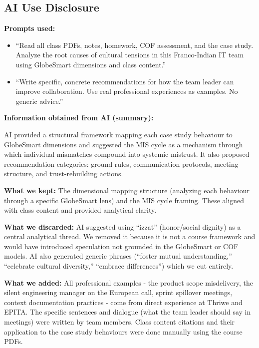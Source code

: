 \documentclass[12pt, a4paper]{article}
\begin{document}
\vspace{3em}

\subsection*{AI Use Disclosure}

\textbf{Prompts used:}
\begin{itemize}[noitemsep]
    \item ``Read all class PDFs, notes, homework, COF assessment, and the case study. Analyze the root causes of cultural tensions in this Franco-Indian IT team using GlobeSmart dimensions and class content.''
    \item ``Write specific, concrete recommendations for how the team leader can improve collaboration. Use real professional experiences as examples. No generic advice.''
\end{itemize}

\textbf{Information obtained from AI (summary):}

AI provided a structural framework mapping each case study behaviour to GlobeSmart dimensions and suggested the MIS cycle as a mechanism through which individual mismatches compound into systemic mistrust. It also proposed recommendation categories: ground rules, communication protocols, meeting structure, and trust-rebuilding actions.

\textbf{What we kept:} The dimensional mapping structure (analyzing each behaviour through a specific GlobeSmart lens) and the MIS cycle framing. These aligned with class content and provided analytical clarity.

\textbf{What we discarded:} AI suggested using ``izzat'' (honor/social dignity) as a central analytical thread. We removed it because it is not a course framework and would have introduced speculation not grounded in the GlobeSmart or COF models. AI also generated generic phrases (``foster mutual understanding,'' ``celebrate cultural diversity,'' ``embrace differences'') which we cut entirely.

\textbf{What we added:} All professional examples - the product scope misdelivery, the silent engineering manager on the European call, sprint spillover meetings, context documentation practices - come from direct experience at Thriwe and EPITA. The specific sentences and dialogue (what the team leader should say in meetings) were written by team members. Class content citations and their application to the case study behaviours were done manually using the course PDFs.
\end{document}
